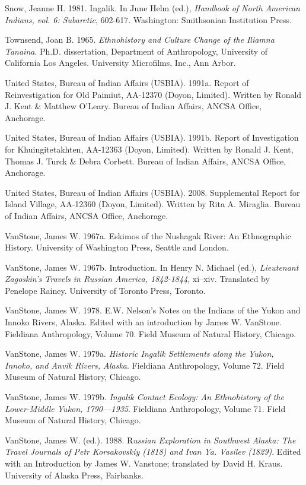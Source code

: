 \begin{hang}
Snow, Jeanne H. 1981. Ingalik. In June Helm (ed.), \textit{Handbook of North American Indians, vol. 6: Subarctic}, 602-617. Washington: Smithsonian Institution Press.

Townsend, Joan B. 1965. \textit{Ethnohistory and Culture Change of the Iliamna Tanaina}. Ph.D. dissertation, Department of Anthropology, University of California Los Angeles. University Microfilms, Inc., Ann Arbor.

United States, Bureau of Indian Affairs (USBIA). 1991a.	Report of Reinvestigation for Old Paimiut, AA-12370 (Doyon, Limited). Written by Ronald J. Kent \& Matthew O’Leary. Bureau of Indian Affairs, ANCSA Office, Anchorage.

United States, Bureau of Indian Affairs (USBIA). 1991b.	Report of Investigation for Khuingitetakhten, AA-12363 (Doyon, Limited). Written by Ronald J. Kent, Thomas J. Turck \& Debra Corbett. Bureau of Indian Affairs, ANCSA Office, Anchorage.


United States, Bureau of Indian Affairs (USBIA). 2008. Supplemental Report for Island Village, AA-12360 (Doyon, Limited). Written by Rita A. Miraglia. Bureau of Indian Affairs, ANCSA Office, Anchorage.

VanStone, James W. 1967a.	Eskimos of the Nushagak River: An Ethnographic History. University of Washington Press, Seattle and London.

VanStone, James W. 1967b.	Introduction.  In Henry N. Michael (ed.), \textit{Lieutenant Zagoskin’s Travels in Russian America, 1842-1844}, xi--xiv. Translated by Penelope Rainey.  University of Toronto Press, Toronto.

VanStone, James W. 1978. E.W. Nelson’s Notes on the Indians of the Yukon and Innoko Rivers, Alaska. Edited with an introduction by James W. VanStone. Fieldiana Anthropology, Volume 70. Field Museum of Natural History, Chicago.

VanStone, James W. 1979a.	\textit{Historic Ingalik Settlements along the Yukon, Innoko, and Anvik Rivers, Alaska}. Fieldiana Anthropology, Volume 72. Field Museum of Natural History, Chicago.

VanStone, James W. 1979b.	\textit{Ingalik Contact Ecology: An Ethnohistory of the Lower-Middle Yukon, 1790—1935}. Fieldiana Anthropology, Volume 71. Field Museum of Natural History, Chicago.

VanStone, James W. (ed.). 1988. R\textit{ussian Exploration in Southwest Alaska: The Travel Journals of Petr Korsakovskiy (1818) and Ivan Ya. Vasilev (1829)}. Edited with an Introduction by James W. Vanstone; translated by David H. Kraus. University of Alaska Press, Fairbanks.


\end{hang}
